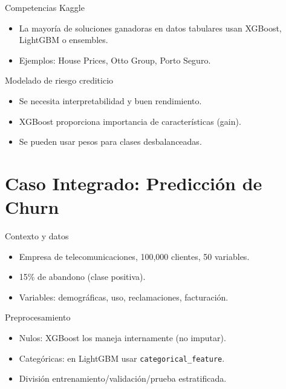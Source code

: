 \documentclass[aspectratio=169, 10pt, xcolor=table]{beamer}
\begin{document}
\begin{frame}{Competencias Kaggle}
    \begin{itemize}
        \item La mayoría de soluciones ganadoras en datos tabulares usan XGBoost, LightGBM o ensembles.
        \item Ejemplos: House Prices, Otto Group, Porto Seguro.
    \end{itemize}
\end{frame}

\begin{frame}{Modelado de riesgo crediticio}
    \begin{itemize}
        \item Se necesita interpretabilidad y buen rendimiento.
        \item XGBoost proporciona importancia de características (gain).
        \item Se pueden usar pesos para clases desbalanceadas.
    \end{itemize}
\end{frame}

\section{Caso Integrado: Predicción de Churn}

\begin{frame}{Contexto y datos}
    \begin{itemize}
        \item Empresa de telecomunicaciones, 100,000 clientes, 50 variables.
        \item 15\% de abandono (clase positiva).
        \item Variables: demográficas, uso, reclamaciones, facturación.
    \end{itemize}
    \begin{block}{Preprocesamiento}
        \begin{itemize}
            \item Nulos: XGBoost los maneja internamente (no imputar).
            \item Categóricas: en LightGBM usar \texttt{categorical\_feature}.
            \item División entrenamiento/validación/prueba estratificada.
        \end{itemize}
    \end{block}
\end{frame}
\end{document}
